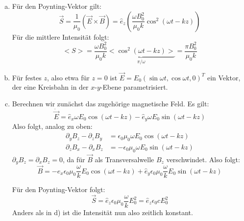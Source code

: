 \begin{enumerate}[(a)]
\item Für den Poynting-Vektor gilt:
\begin{equation}
\vec{S} = \frac{1}{\mu_0} \left(\vec{E} \times \vec{B} \right) = \hat{e}_z \left(\frac{\omega B_0^2}{\mu_0 k} \cos^2 (\omega t - kz) \right)
\end{equation}
Für die mittlere Intensität folgt:
\begin{equation}
<S> = \frac{\omega B_0^2}{\mu_0 k} \underbrace{<\cos^2 (\omega t - kz)>}_{\pi/\omega} = \frac{\pi B_0^2}{\mu_0 k}
\end{equation}
\item Für festes $z$, also etwa für $z=0$ ist $\vec{E}= E_0 (\sin{\omega t},\cos{\omega t},0)^T$ ein Vektor, der eine Kreisbahn in der $x$-$y$-Ebene parametrisiert.
\item Berechnen wir zunächst das zugehörige magnetische Feld. Es gilt:
\begin{equation}
\dot{\vec{E}} = \hat{e}_x \omega E_0 \cos{(\omega t - kz)} - \hat{e}_y \omega E_0 \sin{(\omega t - kz)}
\end{equation}
Also folgt, analog zu oben:
\begin{align}
\partial_y B_z - \partial_z B_y &= \epsilon_0 \mu_0 \omega E_0 \cos{(\omega t - kz)}\\
\partial_z B_x - \partial_x B_z &= -\epsilon_0 \mu_0 \omega E_0 \sin{(\omega t - kz)}
\end{align}
$\partial_y B_z= \partial_x B_z = 0$, da für $\vec{B}$ als Transversalwelle $B_z$ verschwindet. Also folgt:
\begin{equation}
\vec{B} = -\hat{e}_x \epsilon_0 \mu_0\frac{\omega}{k}E_0 \cos{(\omega t - kz)}+\hat{e}_y \epsilon_0 \mu_0\frac{\omega}{k}E_0 \sin{(\omega t - kz)}
\end{equation}

Für den Poynting-Vektor folgt:
\begin{equation}
\vec{S} = \hat{e}_z\epsilon_0 \mu_0\frac{\omega}{k} E_0^2 =\hat{e}_z\epsilon_0 c E_0^2 
\end{equation}
Anders als in d) ist die Intensität nun also zeitlich konstant. 
\end{enumerate}